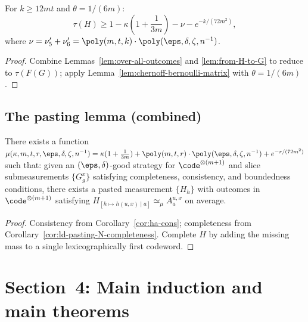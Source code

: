 \begin{corollary}[Completeness of $H$]\label{cor:ld-pasting-N-completeness}
  For $k\ge 12mt$ and $\theta=1/(6m)$:
  \[
    \tau(H)\ge 1-\kappa\!\left(1+\frac1{3m}\right)-\nu-e^{-k/(72m^2)},
  \]
  where $\nu=\nu'_5+\nu'_6=\poly(m,t,k)\cdot\poly(\eps,\delta,\zeta,n^{-1})$.
\end{corollary}
\begin{proof}
  Combine Lemmas~\ref{lem:over-all-outcomes} and \ref{lem:from-H-to-G}
  to reduce to $\tau(F(G))$; apply Lemma~\ref{lem:chernoff-bernoulli-matrix}
  with $\theta = 1/(6m)$.
\end{proof}

\section{The pasting lemma (combined)}

\begin{lemma}[Pasting]\label{lem:pasting}
  There exists a function
  $\mu(\kappa,m,t,r,\eps,\delta,\zeta,n^{-1})
    =\kappa(1+\frac{1}{3m})+\poly(m,t,r)\cdot\poly(\eps,\delta,\zeta,n^{-1})+e^{-r/(72m^2)}$
  such that: given an $(\eps,\delta)$-good strategy for $\code^{\otimes(m+1)}$
  and slice submeasurements $\{G^x_g\}$ satisfying completeness, consistency,
  and boundedness conditions, there exists a pasted measurement $\{H_h\}$
  with outcomes in $\code^{\otimes(m+1)}$ satisfying
  $H_{[h\mapsto h(u,x)\mid a]}\simeq_\mu A^{u,x}_a$ on average.
\end{lemma}
\begin{proof}
  Consistency from Corollary~\ref{cor:ha-cons};
  completeness from Corollary~\ref{cor:ld-pasting-N-completeness}.
  Complete $H$ by adding the missing mass to a single lexicographically
  first codeword.
\end{proof}


\chapter{Section~4: Main induction and main theorems}
\label{chap:main-loop}

